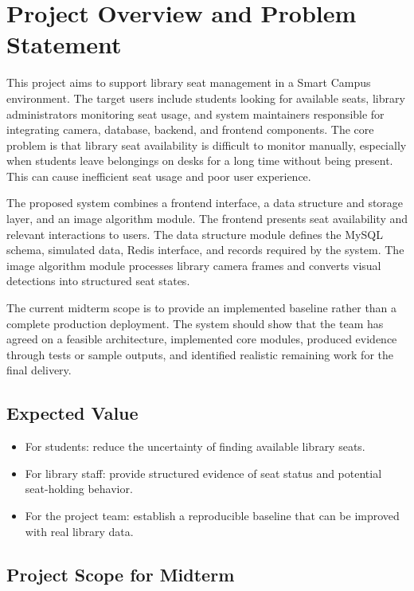 \section{Project Overview and Problem Statement}

This project aims to support library seat management in a Smart Campus environment. The target users include students looking for available seats, library administrators monitoring seat usage, and system maintainers responsible for integrating camera, database, backend, and frontend components. The core problem is that library seat availability is difficult to monitor manually, especially when students leave belongings on desks for a long time without being present. This can cause inefficient seat usage and poor user experience.

The proposed system combines a frontend interface, a data structure and storage layer, and an image algorithm module. The frontend presents seat availability and relevant interactions to users. The data structure module defines the MySQL schema, simulated data, Redis interface, and records required by the system. The image algorithm module processes library camera frames and converts visual detections into structured seat states.

The current midterm scope is to provide an implemented baseline rather than a complete production deployment. The system should show that the team has agreed on a feasible architecture, implemented core modules, produced evidence through tests or sample outputs, and identified realistic remaining work for the final delivery.

\subsection{Expected Value}

\begin{itemize}
  \item For students: reduce the uncertainty of finding available library seats.
  \item For library staff: provide structured evidence of seat status and potential seat-holding behavior.
  \item For the project team: establish a reproducible baseline that can be improved with real library data.
\end{itemize}

\subsection{Project Scope for Midterm}

